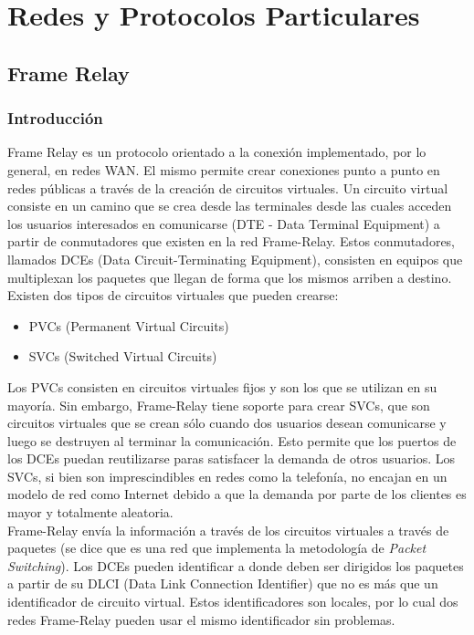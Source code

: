 \section{Redes y Protocolos Particulares}
	\subsection{Frame Relay}
		\subsubsection{Introducción}
			\indent Frame Relay es un protocolo orientado a la conexión implementado, por lo general, en redes WAN. El mismo permite crear
			conexiones punto a punto en redes públicas a través de la creación de circuitos virtuales. Un circuito virtual consiste
			en un camino que se crea desde las terminales desde las cuales acceden los usuarios interesados en comunicarse 
			(DTE - Data Terminal Equipment) a partir de conmutadores que existen en la red Frame-Relay. Estos conmutadores, llamados DCEs 
			(Data Circuit-Terminating Equipment), consisten en equipos que multiplexan los paquetes que llegan de forma que los mismos arriben a destino. \\
			Existen dos tipos de circuitos virtuales que pueden crearse:

			\begin{itemize}
				\item PVCs (Permanent Virtual Circuits) 
				\item SVCs (Switched Virtual Circuits)
			\end{itemize} 

			Los PVCs consisten en circuitos virtuales fijos y son los que se utilizan en su mayoría. Sin embargo, Frame-Relay tiene soporte para crear
			SVCs, que son circuitos virtuales que se crean sólo cuando dos usuarios desean comunicarse y luego se destruyen al terminar la comunicación.
			Esto permite que los puertos de los DCEs puedan reutilizarse paras satisfacer la demanda de otros usuarios. Los SVCs, si bien son imprescindibles
			en redes como la telefonía, no encajan en un modelo de red como Internet debido a que la demanda por parte de los clientes es mayor y totalmente
			aleatoria. \\
			\indent Frame-Relay envía la información a través de los circuitos virtuales a través de paquetes (se dice que es una red que implementa la
			metodología de \textit{Packet Switching}). Los DCEs pueden identificar a donde deben ser dirigidos los paquetes a partir de su DLCI (Data Link 
			Connection Identifier) que no es más que un identificador de circuito virtual. Estos identificadores son locales, por lo cual dos redes 
			Frame-Relay pueden usar el mismo identificador sin problemas. 

